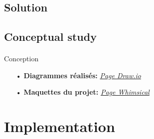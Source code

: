 
\subsection{Solution}
\begin{frame}[fragile=singleslide]{\insertsectionhead}
  \framesubtitle{\insertsubsectionhead}
  \begin{figure}[b]
  \end{figure}
\end{frame}


\subsection{Conceptual study}
\begin{frame}[fragile=singleslide]{\insertsectionhead}
  \framesubtitle{\insertsubsectionhead}
  Conception
  \begin{itemize}
    \item[•] \textbf{Diagrammes réalisés:} \href{https://viewer.diagrams.net/?tags=&highlight=0000ff&edit=_blank&layers=1&nav=1&title=Diagram.drawio#Uhttps%3A%2F%2Fraw.githubusercontent.com%2Fabdorah%2Fstage2021%2Fmaster%2Fdiagramms%2FDiagram.drawio}{\textit{Page Draw.io}}
		\item[•] \textbf{Maquettes du projet:} \href{https://whimsical.com/kdi-ux-design-J9PD866564ibwyMBwLHN9N}{\textit{Page Whimsical}}
  \end{itemize}
\end{frame}

\section{Implementation}

